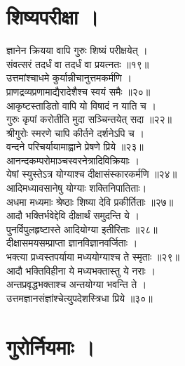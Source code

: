 \section{शिष्यपरीक्षा ।}

ज्ञानेन क्रियया वापि गुरुः शिष्यं परीक्षयेत् ।\\[-2mm]
संवत्सरं तदर्धं वा तदर्धं वा प्रयत्नतः ॥१९॥\\
उत्तमांश्चाधमे कुर्यान्नीचानुत्तमकर्मणि ।\\[-2mm]
प्राणद्रव्यप्रणामाद्यैरादेशैश्च स्वयं समैः ॥२०॥\\
आकृष्टस्ताडितो वापि यो विषादं न याति च ।\\[-2mm]
गुरुः कृपां करोतीति मुदा सञ्चिन्तयेत् सदा ॥२२॥\\
श्रीगुरोः स्मरणे चापि कीर्तने दर्शनेऽपि च ।\\[-2mm]
वन्दने परिचर्यायामाह्वाने प्रेषणे प्रिये ॥२३॥\\
आनन्दकम्परोमाञ्चस्वरनेत्रादिविक्रियाः ।\\[-2mm]
येषां स्युस्तेऽत्र योग्याश्च दीक्षासंस्कारकर्मणि ॥२४॥\\
आदिमध्यावसानेषु योग्याः शक्तिनिपातिताः।\\[-2mm]
अधमा मध्यमाः श्रेष्ठाः शिष्या देवि प्रकीर्तिताः ॥२७॥\\
आदौ भक्तिर्भवेद्देवि दीक्षार्थं समुदन्ति ये ।\\[-2mm]
पुनर्विपुलहृष्टास्ते आदियोग्या इतीरिताः ॥२८॥\\
दीक्षासमयसम्प्राप्ता ज्ञानविज्ञानवर्जिताः ।\\[-2mm]
भक्त्या प्रध्वस्तपर्याया मध्ययोग्याश्च ते स्मृताः ॥२९॥\\
आदौ भक्तिविहीना ये मध्यभक्तास्तु ये नराः ।\\[-2mm]
अन्तप्रवृद्धभक्ताश्च अन्तयोग्या भवन्ति ते ।\\[-2mm]
उत्तमज्ञानसंज्ञांश्चेत्युपदेशस्त्रिधा प्रिये ॥३०॥\\

\section{गुरोर्नियमाः ।}

